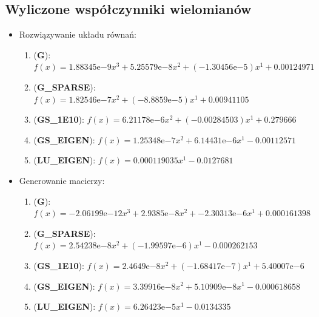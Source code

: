 \documentclass[10pt]{article}
\newcommand{\expnumber}[2]{{#1}\mathrm{e}{#2}}
\begin{document}
\subsection{Wyliczone współczynniki wielomianów}
\begin{itemize}
	\item Rozwiązywanie układu równań:
	\begin{enumerate}
		\item (\textbf{G}): $f(x) = \expnumber{1.88345}{-9} x^3 + \expnumber{5.25579}{-8} x^2 + (\expnumber{-1.30456}{-5}) x^1 + 0.00124971$
		\item (\textbf{G\_SPARSE}): $f(x) = \expnumber{1.82546}{-7} x^2 + (\expnumber{-8.8859}{-5}) x^1 + 0.00941105$
		\item (\textbf{GS\_1E10}): $f(x) = \expnumber{6.21178}{-6} x^2 + (-0.00284503) x^1 + 0.279666$
		\item (\textbf{GS\_EIGEN}): $f(x) = \expnumber{1.25348}{-7} x^2 + \expnumber{6.14431}{-6} x^1 - 0.00112571$
		\item (\textbf{LU\_EIGEN}): $f(x) = 0.000119035 x^1 - 0.0127681$
	\end{enumerate}
	\item Generowanie macierzy:
	\begin{enumerate}
		\item (\textbf{G}): $f(x) = \expnumber{-2.06199}{-12} x^3 + \expnumber{2.9385}{-8} x^2 + \expnumber{-2.30313}{-6} x^1 + 0.000161398$
		\item (\textbf{G\_SPARSE}): $f(x) = \expnumber{2.54238}{-8} x^2 + (\expnumber{-1.99597}{-6}) x^1 - 0.000262153$
		\item (\textbf{GS\_1E10}): $f(x) = \expnumber{2.4649}{-8} x^2 + (\expnumber{-1.68417}{-7}) x^1 + \expnumber{5.40007}{-6}$
		\item (\textbf{GS\_EIGEN}): $f(x) = \expnumber{3.39916}{-8} x^2 + \expnumber{5.10909}{-8} x^1 - 0.000618658$
		\item (\textbf{LU\_EIGEN}): $f(x) = \expnumber{6.26423}{-5} x^1 - 0.0134335$
	\end{enumerate}
\end{itemize}
\end{document}
